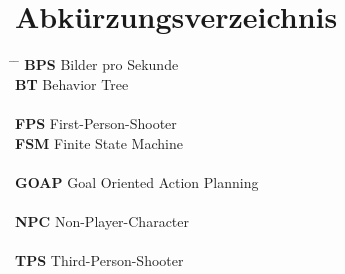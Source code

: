 \chapter*{Abkürzungsverzeichnis}

\begin{tabbing}
    \hspace{3cm} \= \hspace{8cm} \= \kill
    \textbf{BPS}  \> Bilder pro Sekunde \\
    \textbf{BT}   \> Behavior Tree \\
		\\
    \textbf{FPS}  \> First-Person-Shooter \\
    \textbf{FSM}  \> Finite State Machine \\
		\\
    \textbf{GOAP} \> Goal Oriented Action Planning \\
		\\
    \textbf{NPC}  \> Non-Player-Character \\
		\\
    \textbf{TPS}  \> Third-Person-Shooter \\
\end{tabbing}
